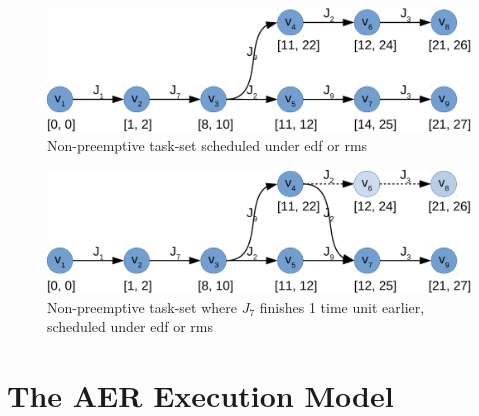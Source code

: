 \documentclass{kththesis}
\begin{document}
\begin{figure}

    \centering

    \includegraphics[width=0.8\linewidth]{images/scheduling_graph.pdf}

    \caption{Non-preemptive task-set scheduled under \acrshort{edf} or \acrshort{rms}}

    \label{fig:scheduling_graph}

\end{figure}


\begin{figure}

    \centering

    \includegraphics[width=0.8\linewidth]{images/scheduling_graph_merge.pdf}

    \caption{Non-preemptive task-set where $J_7$ finishes 1 time unit earlier, scheduled under
    \acrshort{edf} or \acrshort{rms}}

    \label{fig:scheduling_graph_merge}

\end{figure}

\section{The AER Execution Model}
\end{document}
